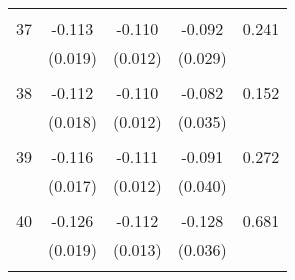\begin{tabular}{l*{1}{cccc}}
 & & & &\\
  37       & -0.113 & -0.110 & -0.092 & 0.241 \\
          & (0.019) & (0.012) & (0.029) & \\
 & & & &\\
  38       & -0.112 & -0.110 & -0.082 & 0.152 \\
          & (0.018) & (0.012) & (0.035) & \\
 & & & &\\
  39       & -0.116 & -0.111 & -0.091 & 0.272 \\
          & (0.017) & (0.012) & (0.040) & \\
 & & & &\\
  40       & -0.126 & -0.112 & -0.128 & 0.681 \\
          & (0.019) & (0.013) & (0.036) & \\
 & & & &\\
\hline\hline
\end{tabular}
